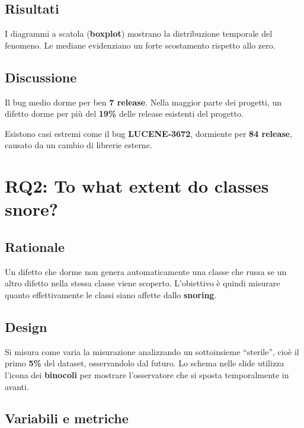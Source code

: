 \subsection{Risultati}

I diagrammi a scatola (\textbf{boxplot}) mostrano la distribuzione temporale del fenomeno. Le mediane evidenziano un forte scostamento rispetto allo zero.

\subsection{Discussione}

Il bug medio dorme per ben \textbf{7 release}. Nella maggior parte dei progetti, un difetto dorme per più del \textbf{19\%} delle release esistenti del progetto.

\begin{notaslide}
Esistono casi estremi come il bug \textbf{LUCENE-3672}, dormiente per \textbf{84 release}, causato da un cambio di librerie esterne.
\end{notaslide}

\section{RQ2: To what extent do classes snore?}

\subsection{Rationale}

Un difetto che dorme non genera automaticamente una classe che russa se un altro difetto nella stessa classe viene scoperto. L'obiettivo è quindi misurare quanto effettivamente le classi siano affette dallo \textbf{snoring}.

\subsection{Design}

Si misura come varia la misurazione analizzando un sottoinsieme ``sterile'', cioè il primo \textbf{5\%} del dataset, osservandolo dal futuro. Lo schema nelle slide utilizza l'icona dei \textbf{binocoli} per mostrare l'osservatore che si sposta temporalmente in avanti.

\subsection{Variabili e metriche}

